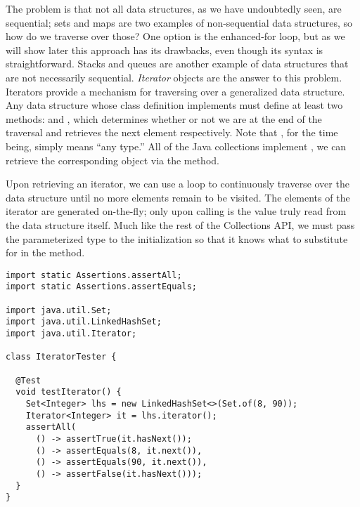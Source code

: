The problem is that not all data structures, as we have undoubtedly seen, are sequential; sets and maps are two examples of non-sequential data structures, so how do we traverse over those? One option is the enhanced-for loop, but as we will show later this approach has its drawbacks, even though its syntax is straightforward. Stacks and queues are another example of data structures that are not necessarily sequential. \emph{Iterator} objects are the answer to this problem. Iterators provide a mechanism for traversing over a generalized data structure. Any data structure whose class definition implements  must define at least two methods:  and , which determines whether or not we are at the end of the traversal and retrieves the next element respectively. Note that , for the time being, simply means ``any type.'' All of the Java collections implement , we can retrieve the corresponding  object via the  method. 

Upon retrieving an iterator, we can use a  loop to continuously traverse over the data structure until no more elements remain to be visited. The elements of the iterator are generated on-the-fly; only upon calling  is the value truly read from the data structure itself. Much like the rest of the Collections API, we must pass the parameterized type to the  initialization so that it knows what to substitute for  in the  method.


\begin{lstlisting}[language=MyJava]
import static Assertions.assertAll;
import static Assertions.assertEquals;

import java.util.Set;
import java.util.LinkedHashSet;
import java.util.Iterator;

class IteratorTester {

  @Test
  void testIterator() {
    Set<Integer> lhs = new LinkedHashSet<>(Set.of(8, 90));
    Iterator<Integer> it = lhs.iterator();
    assertAll(
      () -> assertTrue(it.hasNext());
      () -> assertEquals(8, it.next()),
      () -> assertEquals(90, it.next()),
      () -> assertFalse(it.hasNext()));
  }
} 
\end{lstlisting}

